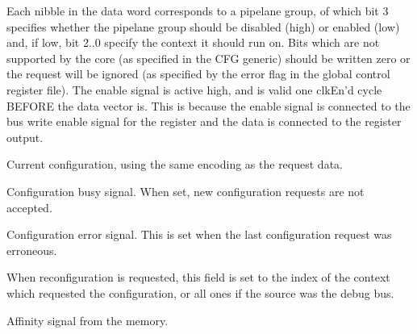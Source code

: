 
\globalInterface{}

\ifaceSubGroup{}
Each nibble in the data word corresponds to a pipelane group, of which bit 3 
specifies whether the pipelane group should be disabled (high) or enabled (low) 
and, if low, bit 2..0 specify the context it should run on. Bits which are not 
supported by the core (as specified in the CFG generic) should be written zero 
or the request will be ignored (as specified by the error flag in the global 
control register file). The enable signal is active high, and is valid one 
clkEn'd cycle BEFORE the data vector is. This is because the enable signal is 
connected to the bus write enable signal for the register and the data is 
connected to the register output.

\ifaceSubGroup{}
Current configuration, using the same encoding as the request data.
    
\ifaceSubGroup{}
Configuration busy signal. When set, new configuration requests are not 
accepted.
    
\ifaceSubGroup{}
Configuration error signal. This is set when the last configuration request was 
erroneous.
    
\ifaceSubGroup{}
When reconfiguration is requested, this field is set to the index of the context 
which requested the configuration, or all ones if the source was the debug bus.

\ifaceSubGroup{}
Affinity signal from the memory.

